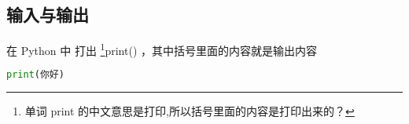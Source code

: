 


\subsection{输入与输出}

在 Python 中 打出 \footnote{单词 print 的中文意思是打印,所以括号里面的内容是打印出来的？}print() ，其中括号里面的内容就是输出内容 

\begin{lstlisting}[language=python]
print(你好)
\end{lstlisting}
